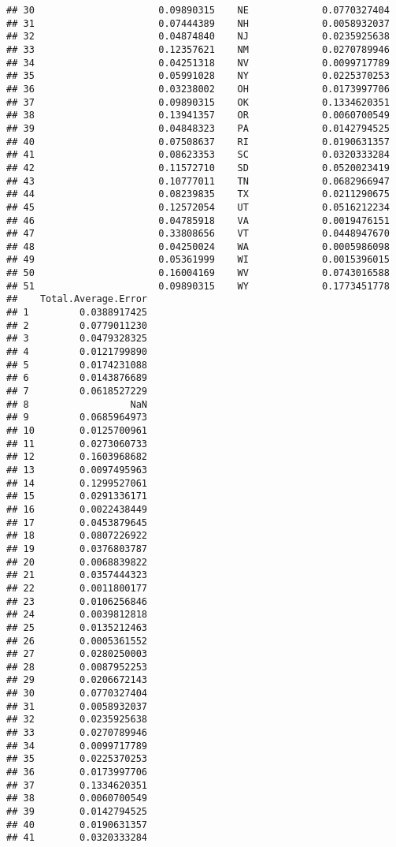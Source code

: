 \documentclass{article}\usepackage[]{graphicx}\usepackage[]{color}
\makeatletter
\newenvironment{kframe}{%
 \def\at@end@of@kframe{}%
 \ifinner\ifhmode%
  \def\at@end@of@kframe{\end{minipage}}%
  \begin{minipage}{\columnwidth}%
 \fi\fi%
 \def\FrameCommand##1{\hskip\@totalleftmargin \hskip-\fboxsep
 \colorbox{shadecolor}{##1}\hskip-\fboxsep
     \hskip-\linewidth \hskip-\@totalleftmargin \hskip\columnwidth}%
 \MakeFramed {\advance\hsize-\width
   \@totalleftmargin\z@ \linewidth\hsize
   \@setminipage}}%
 {\par\unskip\endMakeFramed%
 \at@end@of@kframe}
\newenvironment{knitrout}{}{} %
\makeatother
\begin{document}
\begin{knitrout}
\begin{kframe}
\begin{verbatim}
## 30                      0.09890315    NE             0.0770327404
## 31                      0.07444389    NH             0.0058932037
## 32                      0.04874840    NJ             0.0235925638
## 33                      0.12357621    NM             0.0270789946
## 34                      0.04251318    NV             0.0099717789
## 35                      0.05991028    NY             0.0225370253
## 36                      0.03238002    OH             0.0173997706
## 37                      0.09890315    OK             0.1334620351
## 38                      0.13941357    OR             0.0060700549
## 39                      0.04848323    PA             0.0142794525
## 40                      0.07508637    RI             0.0190631357
## 41                      0.08623353    SC             0.0320333284
## 42                      0.11572710    SD             0.0520023419
## 43                      0.10777011    TN             0.0682966947
## 44                      0.08239835    TX             0.0211290675
## 45                      0.12572054    UT             0.0516212234
## 46                      0.04785918    VA             0.0019476151
## 47                      0.33808656    VT             0.0448947670
## 48                      0.04250024    WA             0.0005986098
## 49                      0.05361999    WI             0.0015396015
## 50                      0.16004169    WV             0.0743016588
## 51                      0.09890315    WY             0.1773451778
##    Total.Average.Error
## 1         0.0388917425
## 2         0.0779011230
## 3         0.0479328325
## 4         0.0121799890
## 5         0.0174231088
## 6         0.0143876689
## 7         0.0618527229
## 8                  NaN
## 9         0.0685964973
## 10        0.0125700961
## 11        0.0273060733
## 12        0.1603968682
## 13        0.0097495963
## 14        0.1299527061
## 15        0.0291336171
## 16        0.0022438449
## 17        0.0453879645
## 18        0.0807226922
## 19        0.0376803787
## 20        0.0068839822
## 21        0.0357444323
## 22        0.0011800177
## 23        0.0106256846
## 24        0.0039812818
## 25        0.0135212463
## 26        0.0005361552
## 27        0.0280250003
## 28        0.0087952253
## 29        0.0206672143
## 30        0.0770327404
## 31        0.0058932037
## 32        0.0235925638
## 33        0.0270789946
## 34        0.0099717789
## 35        0.0225370253
## 36        0.0173997706
## 37        0.1334620351
## 38        0.0060700549
## 39        0.0142794525
## 40        0.0190631357
## 41        0.0320333284

\end{verbatim}
\end{kframe}
\end{knitrout}
\end{document}
